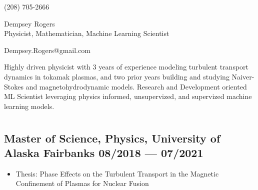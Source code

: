 \documentclass[letterpaper,11pt]{article}
\begin{document}
\begin{center}
    \begin{minipage}[b]{0.24\textwidth}
            \large (208) 705-2666 
    \end{minipage}%
    \begin{minipage}[b]{0.45\textwidth}
            \centering
            {\Huge Dempsey Rogers} \\ %
            \vspace{0.1cm}
            {\color{cvblue} \Large{Physicist, Mathematician, Machine Learning Scientist}} \\
    \end{minipage}%
    \begin{minipage}[t]{0.24\textwidth}
           \flushright 
            \vspace{-.19in}

            \large{Dempsey.Rogers@gmail.com}

    \end{minipage}   

\vspace{-0.15cm} 
{\color{cvblue} \hrulefill}
\end{center}
\vspace{-0.2cm}
Highly driven physicist with 3 years of experience modeling turbulent transport dynamics in tokamak plasmas, and two prior years building and studying Naiver-Stokes and magnetohydrodynamic models. Research and Development oriented ML Scientist leveraging physics informed, unsupervized, and supervized machine learning models. 

\vspace{-0.2cm}


\section*{\color{cvblue}{Education} }
\subsection*{{\color{cvblue}Master of Science, Physics,} {University of Alaska Fairbanks} \hfill 08/2018 --- 07/2021} 

\begin{itemize}
    \setlength{\itemsep}{-.5pt}
    \item Thesis: Phase Effects on the Turbulent Transport in the Magnetic Confinement of Plasmas for Nuclear Fusion
\end{itemize}
\end{document}
